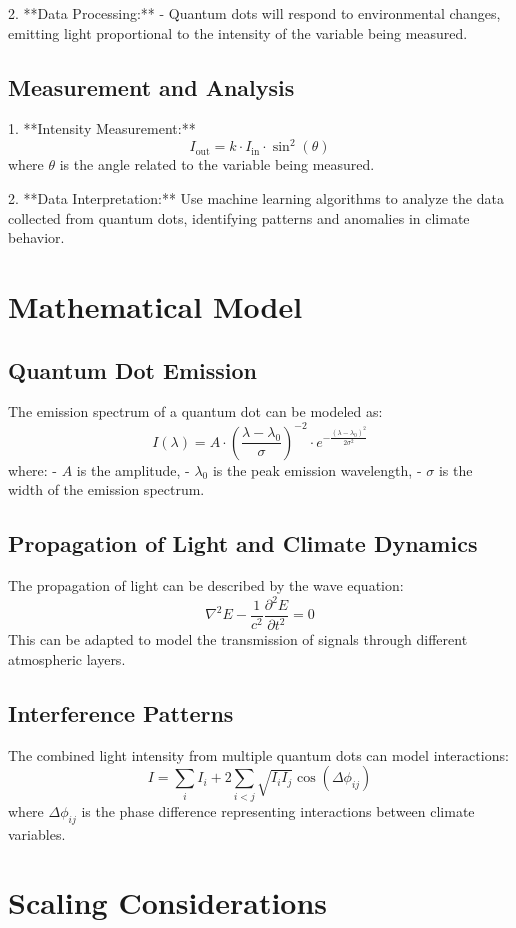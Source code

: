 \documentclass{article}
\begin{document}
2. **Data Processing:**
   - Quantum dots will respond to environmental changes, emitting light proportional to the intensity of the variable being measured.

\subsection{Measurement and Analysis}
1. **Intensity Measurement:**
   \[
   I_{\text{out}} = k \cdot I_{\text{in}} \cdot \sin^2(\theta)
   \]
   where \(\theta\) is the angle related to the variable being measured.

2. **Data Interpretation:** Use machine learning algorithms to analyze the data collected from quantum dots, identifying patterns and anomalies in climate behavior.

\section{Mathematical Model}

\subsection{Quantum Dot Emission}
The emission spectrum of a quantum dot can be modeled as:
\[
I(\lambda) = A \cdot \left(\frac{\lambda - \lambda_0}{\sigma}\right)^{-2} \cdot e^{-\frac{(\lambda - \lambda_0)^2}{2\sigma^2}}
\]
where:
- \(A\) is the amplitude,
- \(\lambda_0\) is the peak emission wavelength,
- \(\sigma\) is the width of the emission spectrum.

\subsection{Propagation of Light and Climate Dynamics}
The propagation of light can be described by the wave equation:
\[
\nabla^2 E - \frac{1}{c^2} \frac{\partial^2 E}{\partial t^2} = 0
\]
This can be adapted to model the transmission of signals through different atmospheric layers.

\subsection{Interference Patterns}
The combined light intensity from multiple quantum dots can model interactions:
\[
I = \sum_{i} I_i + 2\sum_{i < j} \sqrt{I_i I_j} \cos(\Delta \phi_{ij})
\]
where \(\Delta \phi_{ij}\) is the phase difference representing interactions between climate variables.

\section{Scaling Considerations}
\end{document}
